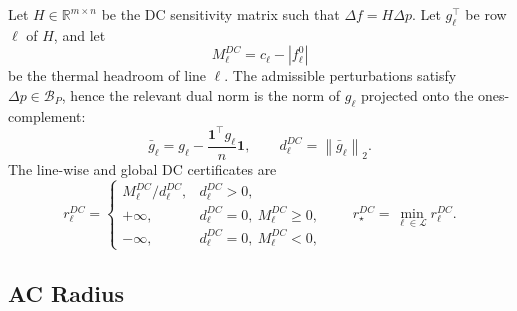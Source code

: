 \documentclass[11pt]{article}
\newcommand{\R}{\mathbb{R}}
\newcommand{\ones}{\mathbf{1}}
\newcommand{\norm}[1]{\left\lVert #1 \right\rVert}
\newcommand{\abs}[1]{\left\lvert #1 \right\rvert}
\begin{document}
Let $H\in\R^{m\times n}$ be the DC sensitivity matrix such that $\Delta f=H\Delta p$. Let $g_\ell^\top$ be row $\ell$ of $H$, and let
\begin{equation}
  M_\ell^{DC}=c_\ell-\abs{f^0_\ell}
\end{equation}
be the thermal headroom of line $\ell$. The admissible perturbations satisfy $\Delta p\in\mathcal{B}_P$, hence the relevant dual norm is the norm of $g_\ell$ projected onto the ones-complement:
\begin{equation}
  \bar g_\ell
  =
  g_\ell - \frac{\ones^\top g_\ell}{n}\ones,
  \qquad
  d_\ell^{DC} = \norm{\bar g_\ell}_2.
\end{equation}
The line-wise and global DC certificates are
\begin{equation}
  r_\ell^{DC} =
  \begin{cases}
    M_\ell^{DC}/d_\ell^{DC}, & d_\ell^{DC}>0,\\
    +\infty, & d_\ell^{DC}=0,\ M_\ell^{DC}\ge 0,\\
    -\infty, & d_\ell^{DC}=0,\ M_\ell^{DC}<0,
  \end{cases}
  \qquad
  r_\star^{DC}=\min_{\ell\in\mathcal{L}}r_\ell^{DC}.
\end{equation}

\subsection{AC Radius}
\end{document}
